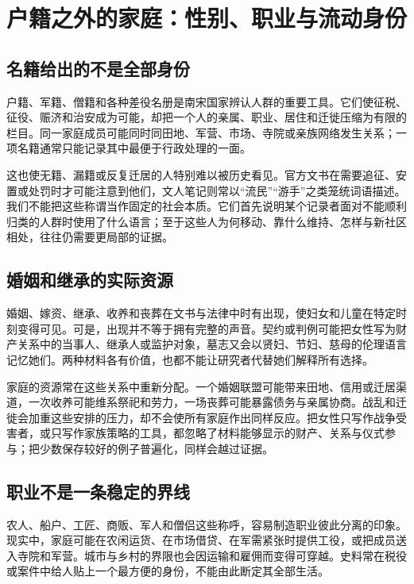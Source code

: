 \section{户籍之外的家庭：性别、职业与流动身份}

\subsection{名籍给出的不是全部身份}

户籍、军籍、僧籍和各种差役名册是南宋国家辨认人群的重要工具。它们使征税、征役、赈济和治安成为可能，却把一个人的亲属、职业、居住和迁徙压缩为有限的栏目。同一家庭成员可能同时同田地、军营、市场、寺院或亲族网络发生关系；一项名籍通常只能记录其中最便于行政处理的一面。

这也使无籍、漏籍或反复迁居的人特别难以被历史看见。官方文书在需要追征、安置或处罚时才可能注意到他们，文人笔记则常以“流民”“游手”之类笼统词语描述。我们不能把这些称谓当作固定的社会本质。它们首先说明某个记录者面对不能顺利归类的人群时使用了什么语言；至于这些人为何移动、靠什么维持、怎样与新社区相处，往往仍需要更局部的证据。

\subsection{婚姻和继承的实际资源}

婚姻、嫁资、继承、收养和丧葬在文书与法律中时有出现，使妇女和儿童在特定时刻变得可见。可是，出现并不等于拥有完整的声音。契约或判例可能把女性写为财产关系中的当事人、继承人或监护对象，墓志又会以贤妇、节妇、慈母的伦理语言记忆她们。两种材料各有价值，也都不能让研究者代替她们解释所有选择。

家庭的资源常在这些关系中重新分配。一个婚姻联盟可能带来田地、信用或迁居渠道，一次收养可能维系祭祀和劳力，一场丧葬可能暴露债务与亲属协商。战乱和迁徙会加重这些安排的压力，却不会使所有家庭作出同样反应。把女性只写作战争受害者，或只写作家族策略的工具，都忽略了材料能够显示的财产、关系与仪式参与；把少数保存较好的例子普遍化，同样会越过证据。

\subsection{职业不是一条稳定的界线}

农人、船户、工匠、商贩、军人和僧侣这些称呼，容易制造职业彼此分离的印象。现实中，家庭可能在农闲运货、在市场借贷、在军需紧张时提供工役，或把成员送入寺院和军营。城市与乡村的界限也会因运输和雇佣而变得可穿越。史料常在税役或案件中给人贴上一个最方便的身份，不能由此断定其全部生活。

